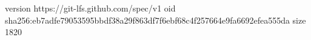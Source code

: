 version https://git-lfs.github.com/spec/v1
oid sha256:eb7adfe79053595bbdf38a29f863df7f6ebf68c4f257664e9fa6692efea555da
size 1820
